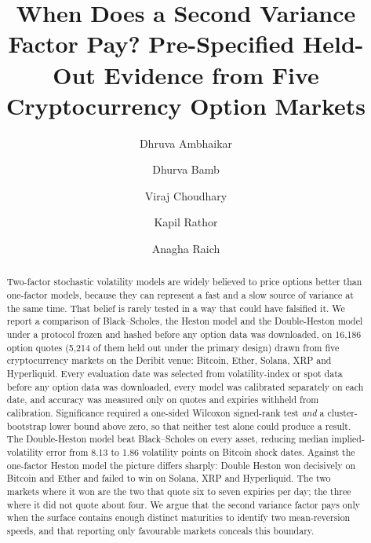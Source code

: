 \documentclass[runningheads]{llncs}
\begin{document}
\title{When Does a Second Variance Factor Pay? Pre-Specified Held-Out
Evidence from Five Cryptocurrency Option Markets}


\author{%
Dhruva Ambhaikar \and
Dhurva Bamb \and
Viraj Choudhary \and
Kapil Rathor \and
Anagha Raich}



\maketitle

\begin{abstract}
Two-factor stochastic volatility models are widely believed to price options
better than one-factor models, because they can represent a fast and a slow
source of variance at the same time. That belief is rarely tested in a way that
could have falsified it. We report a comparison of Black--Scholes, the
Heston model and the Double-Heston model under a protocol frozen and hashed
before any option data was downloaded, on 16,186 option quotes (5,214 of them
held out under the primary design) drawn from five cryptocurrency markets on the Deribit venue: Bitcoin,
Ether, Solana, XRP and Hyperliquid. Every evaluation date was selected from
volatility-index or spot data before any option data was downloaded, every
model was calibrated separately on each date, and accuracy was measured only on
quotes and expiries withheld from calibration. Significance required a
one-sided Wilcoxon signed-rank test \emph{and} a cluster-bootstrap lower bound
above zero, so that neither test alone could produce a result. The
Double-Heston model beat Black--Scholes on every asset, reducing median
implied-volatility error from 8.13 to 1.86 volatility points on Bitcoin shock
dates. Against the one-factor Heston model the picture differs sharply: Double
Heston won decisively on Bitcoin and Ether and failed to win on Solana, XRP and
Hyperliquid. The two markets where it won are the two that quote six to seven
expiries per day; the three where it did not quote about four. We argue that
the second variance factor pays only when the surface contains enough distinct
maturities to identify two mean-reversion speeds, and that reporting only
favourable markets conceals this boundary.

\end{abstract}
\end{document}
